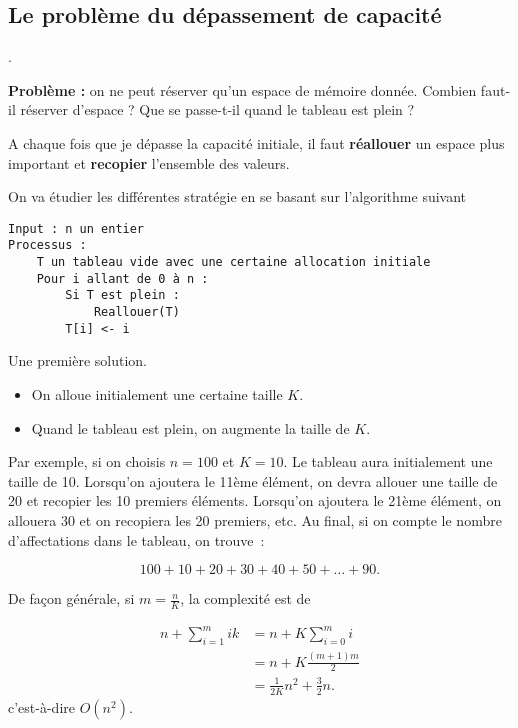 \documentclass{../cours}
\begin{document}
\subsection{Le problème du dépassement de capacité}.

\textbf{Problème : } on ne peut réserver qu'un espace de mémoire donnée. Combien faut-il réserver d'espace ? Que se passe-t-il quand le tableau est plein ?



A chaque fois que je dépasse la capacité initiale, il faut \textbf{réallouer} un espace plus important et \textbf{recopier} l'ensemble des valeurs.

On va étudier les différentes stratégie en se basant sur l'algorithme suivant

\begin{lstlisting}
Input : n un entier
Processus :
    T un tableau vide avec une certaine allocation initiale
    Pour i allant de 0 à n :
        Si T est plein :
            Reallouer(T)
        T[i] <- i
\end{lstlisting}

\begin{Example}Une première solution.

\begin{itemize}
\item On alloue initialement une certaine taille $K$.
\item Quand le tableau est plein, on augmente la taille de $K$.
\end{itemize}

Par exemple, si on choisis $n=100$ et $K=10$. Le tableau aura initialement une taille de 10. Lorsqu'on ajoutera le 11ème élément, on devra allouer une taille de 20 et recopier les 10 premiers éléments. Lorsqu'on ajoutera le 21ème élément, on allouera 30 et on recopiera les 20 premiers, etc. Au final, si on compte le nombre d'affectations dans le tableau, on trouve~:

\begin{equation}
100 + 10 + 20 + 30 + 40 + 50 + \dots + 90.
\end{equation}

De façon générale, si $m=\frac{n}{K}$, la complexité est de

\begin{align}
n + \sum_{i=1}^{m} ik &= n + K \sum_{i=0}^m i \\
&= n + K \frac{(m+1)m}{2} \\
&= \frac{1}{2K} n^2 + \frac{3}{2} n.
\end{align}
c'est-à-dire $O(n^2)$.
\end{Example}
\end{document}
